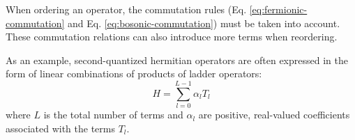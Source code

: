 When ordering an operator, the commutation rules (Eq. \ref{eq:fermionic-commutation} and Eq. \ref{eq:bosonic-commutation}) must be taken into account.
These commutation relations can also introduce more terms when reordering.

As an example, second-quantized hermitian operators are often expressed in the form of linear combinations of products of ladder operators:
\begin{equation}
    \label{eq:lclo}
    H = \sum_{l=0}^{L-1} \alpha_l T_l
\end{equation}
where $L$ is the total number of terms and $\alpha_l$ are positive, real-valued  coefficients associated with the terms $T_l$.
